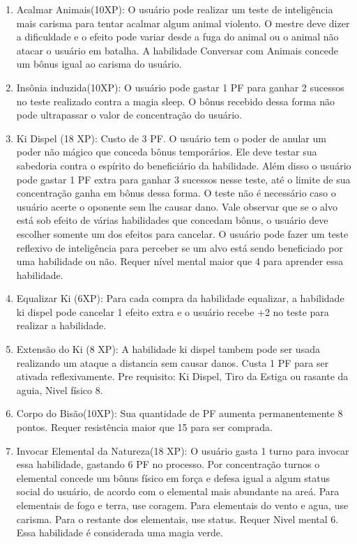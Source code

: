 \begin{enumerate}
  \item Acalmar Animais(10XP): O usuário pode realizar um teste de inteligência mais carisma para tentar acalmar algum animal violento. O mestre deve dizer a dificuldade e o efeito pode variar desde a fuga do animal ou o animal não atacar o usuário em batalha. A habilidade Conversar com Animais concede um bônus igual ao carisma do usuário.

	\item Insônia induzida(10XP): O usuário pode gastar 1 PF para ganhar 2 sucessos no teste realizado contra a magia sleep. O bônus recebido dessa forma não pode ultrapassar o valor de concentração do usuário.
	
  	\item Ki Dispel (18 XP): Custo de 3 PF.
O usuário tem o poder de anular um poder não mágico que conceda bônus temporários. Ele deve testar sua sabedoria contra o espírito do beneficiário da habilidade. Além disso o usuário pode gastar 1 PF extra para ganhar 3 sucessos nesse teste, até o limite de sua concentração ganha em bônus dessa forma. O teste não é necessário caso o usuário acerte o oponente sem lhe causar dano. Vale observar que se o alvo está sob efeito de várias habilidades que concedam bônus, o usuário deve escolher somente um dos efeitos para cancelar. O usuário pode fazer um teste reflexivo de inteligência para perceber se um alvo está sendo beneficiado por uma habilidade ou não. Requer nível mental maior que 4 para aprender essa habilidade.

	\item Equalizar Ki (6XP): Para cada compra da habilidade equalizar, a habilidade ki dispel pode cancelar 1 efeito extra e o usuário recebe +2 no teste para realizar a habilidade.
	
	\item Extensão do Ki (8 XP): A habilidade ki dispel tambem pode ser usada realizando um ataque a distancia sem causar danos. Custa 1 PF para ser ativada reflexivamente. Pre requisito: Ki Dispel, Tiro da Estiga ou rasante da aguia, Nivel físico 8.
	
	\item Corpo do Bisão(10XP): Sua quantidade de PF aumenta permanentemente 8 pontos. Requer resistência maior que 15 para ser comprada.

  	\item Invocar Elemental da Natureza(18 XP): O usuário gasta 1 turno para invocar essa habilidade, gastando 6 PF no processo. Por concentração turnos o elemental concede um bônus físico em força e defesa igual a algum status social do usuário, de acordo com o elemental mais abundante na areá. Para elementais de fogo e terra, use coragem. Para elementais do vento e agua, use carisma. Para o restante dos elementais, use status. Requer Nivel mental 6. Essa habilidade é considerada uma magia verde.


\end{enumerate}
